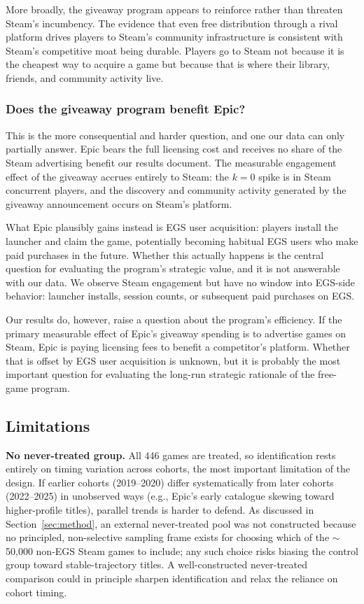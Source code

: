 \documentclass[11pt]{article}
\begin{document}
More broadly, the giveaway program appears to reinforce rather than threaten
Steam's incumbency. The evidence that even free distribution through a rival 
platform drives players to
Steam's community infrastructure is consistent with Steam's competitive moat
being durable. Players go to Steam not because it is the cheapest way to
acquire a game but because that is where their library, friends, and community
activity live.

\subsubsection*{Does the giveaway program benefit Epic?}

This is the more consequential and harder question, and one our data can only
partially answer. Epic bears the full licensing cost and receives no share of
the Steam advertising benefit our results document. The measurable engagement
effect of the giveaway accrues entirely to Steam: the $k = 0$ spike is in
Steam concurrent players, and
the discovery and community activity generated by the giveaway announcement
occurs on Steam's platform.

What Epic plausibly gains instead is EGS user acquisition: players install the
launcher and claim the game, potentially becoming habitual EGS users who make
paid purchases in the future. Whether this actually happens is the central
question for evaluating the program's strategic value, and it is not answerable
with our data. We observe Steam engagement but have no window into EGS-side
behavior: launcher installs, session counts, or subsequent paid purchases
on EGS.

Our results do, however, raise a question about the program's efficiency.
If the primary measurable effect of Epic's giveaway spending is to advertise
games on Steam, Epic is paying licensing fees to benefit a competitor's platform.
Whether that is offset by EGS user acquisition is unknown, but it is probably 
the most important question for evaluating
the long-run strategic rationale of the free-game program.

\subsection{Limitations}

\textbf{No never-treated group.} All 446 games are treated, so identification rests
entirely on timing variation across cohorts, the most important limitation of the
design. If earlier cohorts (2019--2020) differ systematically from later cohorts
(2022--2025) in unobserved ways (e.g., Epic's early catalogue skewing toward
higher-profile titles), parallel trends is harder to defend. As discussed in
Section~\ref{sec:method}, an external never-treated pool was not constructed because
no principled, non-selective sampling frame exists for choosing which of the
$\sim$50{,}000 non-EGS Steam games to include; any such choice risks biasing the
control group toward stable-trajectory titles. A well-constructed never-treated
comparison could in principle sharpen identification and relax the reliance on cohort timing.
\end{document}
